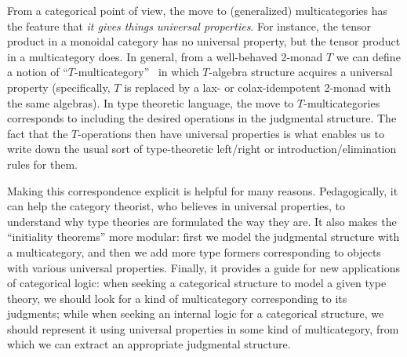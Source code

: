 \documentclass{book}
\begin{document}
From a categorical point of view, the move to (generalized) multicategories has the feature that \emph{it gives things universal properties}.
For instance, the tensor product in a monoidal category has no universal property, but the tensor product in a multicategory does.
In general, from a well-behaved 2-monad $T$ we can define a notion of ``$T$-multicategory''~\cite{burroni:t-cats,leinster:higher-opds,hermida:coh-univ,cs:multicats} in which $T$-algebra structure acquires a universal property (specifically, $T$ is replaced by a lax- or colax-idempotent 2-monad with the same algebras).
In type theoretic language, the move to $T$-multicategories corresponds to including the desired operations in the judgmental structure.
The fact that the $T$-operations then have universal properties is what enables us to write down the usual sort of type-theoretic left/right or introduction/elimination rules for them.

Making this correspondence explicit is helpful for many reasons.
Pedagogically, it can help the category theorist, who believes in universal properties, to understand why type theories are formulated the way they are.
It also makes the ``initiality theorems'' more modular: first we model the judgmental structure with a multicategory, and then we add more type formers corresponding to objects with various universal properties.
Finally, it provides a guide for new applications of categorical logic: when seeking a categorical structure to model a given type theory, we should look for a kind of multicategory corresponding to its judgments; while when seeking an internal logic for a categorical structure, we should represent it using universal properties in some kind of multicategory, from which we can extract an appropriate judgmental structure.
\end{document}
